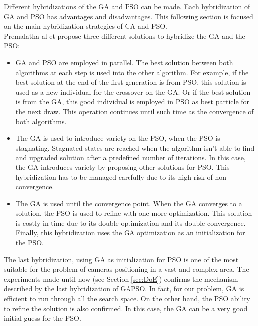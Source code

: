 Different hybridizations of the GA and PSO can be made. Each hybridization of GA and PSO has advantages and disadvantages. This following section is focused on the main hybridization strategies of GA and PSO. \\
Premalatha al et \cite{76*premalatha2009}  propose three different solutions to hybridize the GA and the PSO: 
\begin{itemize}
\item  GA and PSO are employed in parallel. The best solution between both algorithms  at each step is used into the other algorithm. 
For example, if the best solution at the end of the first generation is from PSO, this solution is used as a new individual for the crossover on the GA. Or if the best solution is from the GA, this good individual is employed in PSO as best particle for the next draw. This operation continues until such time as the convergence of both algorithms.   
 
\item The GA is used to introduce variety on the PSO, when the PSO is stagnating. Stagnated states are reached when the algorithm isn't able to find and upgraded solution after a predefined number of iterations. In this case, the GA introduces variety by proposing other solutions for PSO. This hybridization has to be managed carefully due to its high risk of non convergence. 

\item The GA is used until the convergence point. When the GA converges to a solution, the PSO is used to refine with one more optimization. This solution is costly in time due to its double optimization and its double convergence. Finally, this hybridization uses the GA optimization as an initialization for the PSO.\\
\end{itemize}

The last hybridization, using GA as initialization for PSO is one of the most suitable for the problem of cameras positioning in a vast and complex area.  
The experiments made until now (see Section \ref{sec:DoE}) confirms the mechanism described by the last hybridization of GAPSO. In fact, for our problem, GA is efficient to run through all the search space. On the other hand, the PSO ability  to refine the solution is also confirmed.  
In this case, the GA can be a very good initial guess for the PSO. \\

